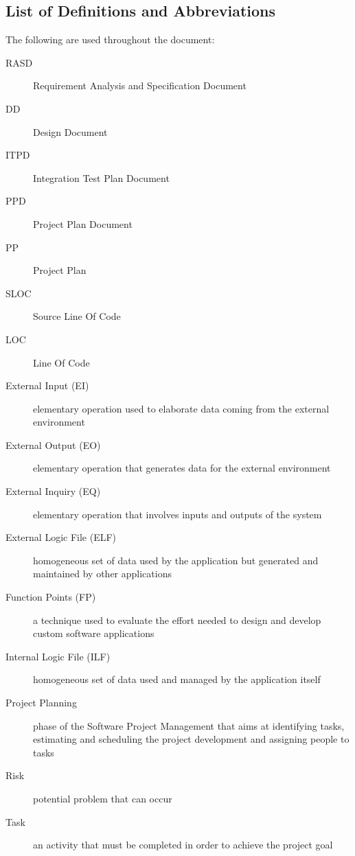 	
\subsection{List of Definitions and Abbreviations}

	The following are used throughout the document:
	\begin{description}
		\item [RASD] Requirement Analysis and Specification Document
		\item [DD] Design Document
		\item [ITPD] Integration Test Plan Document
		\item [PPD] Project Plan Document
		\item [PP] Project Plan
		\item [SLOC] Source Line Of Code
		\item [LOC] Line Of Code
		\item [External Input (EI)] elementary operation used to elaborate data coming from the external environment
		\item [External Output (EO)] elementary operation that generates data for the external environment
		\item [External Inquiry (EQ)] elementary operation that involves inputs and outputs of the system
		\item [External Logic File (ELF)] homogeneous set of data used by the application but generated and maintained by other applications
		\item [Function Points (FP)] a technique used to evaluate the effort needed to design and develop custom software applications
		\item [Internal Logic File (ILF)] homogeneous set of data used and managed by the application itself
		\item [Project Planning] phase of the Software Project Management that aims at identifying tasks, estimating and scheduling the project development and assigning people to tasks
		\item [Risk] potential problem that can occur
		\item [Task] an activity that must be completed in order to achieve the project goal
	\end{description}


